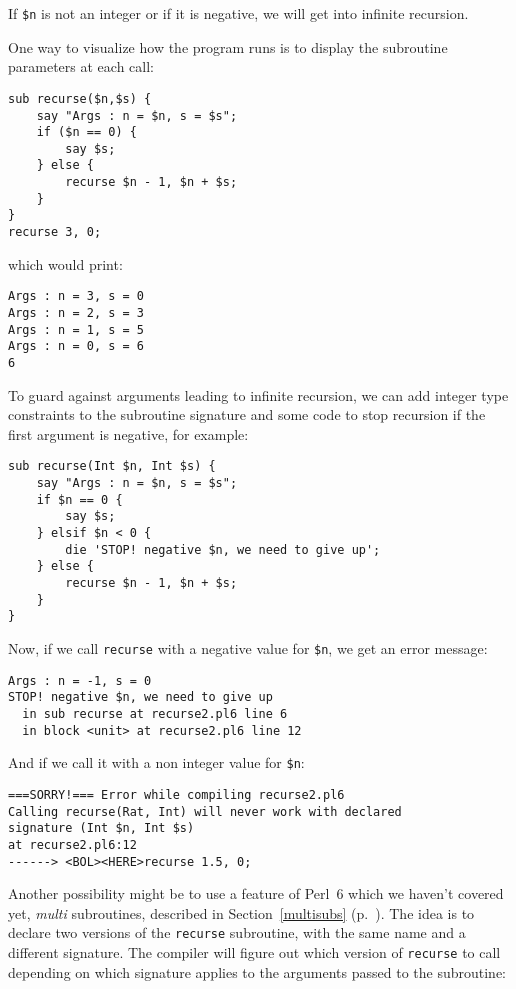 If \verb'$n' is not an integer or if it is negative, we will get 
into infinite recursion.

One way to visualize how the program runs is to display 
the subroutine parameters at each call:

\begin{verbatim}
sub recurse($n,$s) {
    say "Args : n = $n, s = $s";
    if ($n == 0) {
        say $s;
    } else {
        recurse $n - 1, $n + $s;
    }
}
recurse 3, 0;
\end{verbatim}
which would print:
\begin{verbatim}
Args : n = 3, s = 0
Args : n = 2, s = 3
Args : n = 1, s = 5
Args : n = 0, s = 6
6
\end{verbatim}

To guard against arguments leading to infinite recursion, 
we can add integer type constraints to the subroutine 
signature and some code to stop recursion if the first 
argument is negative, for example:

\begin{verbatim}
sub recurse(Int $n, Int $s) {
    say "Args : n = $n, s = $s";
    if $n == 0 {
        say $s;
    } elsif $n < 0 {
        die 'STOP! negative $n, we need to give up';
    } else {
        recurse $n - 1, $n + $s;
    }
}
\end{verbatim}
%

Now, if we call {\tt recurse} with a negative value for 
\verb'$n', we get an error message:

\begin{verbatim}
Args : n = -1, s = 0
STOP! negative $n, we need to give up
  in sub recurse at recurse2.pl6 line 6
  in block <unit> at recurse2.pl6 line 12
\end{verbatim}
%

And if we call it with a non integer value for \verb'$n':

\begin{verbatim}
===SORRY!=== Error while compiling recurse2.pl6
Calling recurse(Rat, Int) will never work with declared
signature (Int $n, Int $s)
at recurse2.pl6:12
------> <BOL><HERE>recurse 1.5, 0;
\end{verbatim}
%

Another possibility might be to use a feature of Perl~6 which 
we haven't covered yet, \emph{multi} subroutines, described in 
Section~\ref{multisubs} (p.~\pageref{multisubs}). 
The idea is to declare two versions of the {\tt recurse} 
subroutine, with the same name and a different signature. 
The compiler will figure out which version of {\tt recurse} 
to call depending on which signature applies to the 
arguments passed to the subroutine:

